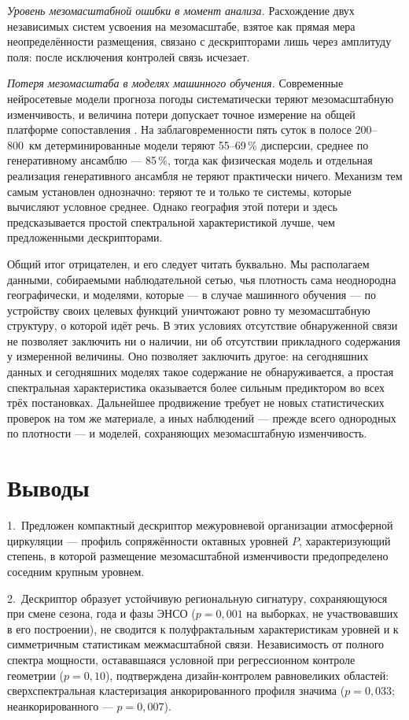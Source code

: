 \documentclass[11pt,a4paper]{article}
\begin{document}
\emph{Уровень мезомасштабной ошибки в момент анализа.} Расхождение двух независимых систем усвоения на мезомасштабе, взятое как прямая мера неопределённости размещения, связано с дескрипторами лишь через амплитуду поля: после исключения контролей связь исчезает.

\emph{Потеря мезомасштаба в моделях машинного обучения.} Современные нейросетевые модели прогноза погоды \cite{Lam2023,Bi2023,Price2025} систематически теряют мезомасштабную изменчивость, и величина потери допускает точное измерение на общей платформе сопоставления \cite{Rasp2024}. На заблаговременности пять суток в полосе 200--800~км детерминированные модели теряют 55--69\,\% дисперсии, среднее по генеративному ансамблю --- 85\,\%, тогда как физическая модель и отдельная реализация генеративного ансамбля не теряют практически ничего. Механизм тем самым установлен однозначно: теряют те и только те системы, которые вычисляют условное среднее. Однако география этой потери и здесь предсказывается простой спектральной характеристикой лучше, чем предложенными дескрипторами.

Общий итог отрицателен, и его следует читать буквально. Мы располагаем данными, собираемыми наблюдательной сетью, чья плотность сама неоднородна географически, и моделями, которые --- в случае машинного обучения --- по устройству своих целевых функций уничтожают ровно ту мезомасштабную структуру, о которой идёт речь. В этих условиях отсутствие обнаруженной связи не позволяет заключить ни о наличии, ни об отсутствии прикладного содержания у измеренной величины. Оно позволяет заключить другое: на сегодняшних данных и сегодняшних моделях такое содержание не обнаруживается, а простая спектральная характеристика оказывается более сильным предиктором во всех трёх постановках. Дальнейшее продвижение требует не новых статистических проверок на том же материале, а иных наблюдений --- прежде всего однородных по плотности --- и моделей, сохраняющих мезомасштабную изменчивость.

\section{Выводы}
\label{sec:conclusion}

1.~Предложен компактный дескриптор межуровневой организации атмосферной циркуляции --- профиль сопряжённости октавных уровней $P$, характеризующий степень, в которой размещение мезомасштабной изменчивости предопределено соседним крупным уровнем.

2.~Дескриптор образует устойчивую региональную сигнатуру, сохраняющуюся при смене сезона, года и фазы ЭНСО ($p=0{,}001$ на выборках, не участвовавших в его построении), не сводится к полуфрактальным характеристикам уровней и к симметричным статистикам межмасштабной связи. Независимость от полного спектра мощности, остававшаяся условной при регрессионном контроле геометрии ($p=0{,}10$), подтверждена дизайн-контролем равновеликих областей: сверхспектральная кластеризация анкорированного профиля значима ($p=0{,}033$; неанкорированного --- $p=0{,}007$).
\end{document}
